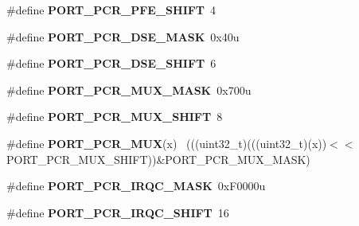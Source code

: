 \begin{DoxyCompactItemize}
\item 
\hypertarget{group___p_o_r_t___register___masks_gae7d057ebd3218784fca57f55a85f2d29}{}\#define {\bfseries P\+O\+R\+T\+\_\+\+P\+C\+R\+\_\+\+P\+F\+E\+\_\+\+S\+H\+I\+F\+T}~4\label{group___p_o_r_t___register___masks_gae7d057ebd3218784fca57f55a85f2d29}

\item 
\hypertarget{group___p_o_r_t___register___masks_gae1c37b9f66e58bd80e7764232fd05cee}{}\#define {\bfseries P\+O\+R\+T\+\_\+\+P\+C\+R\+\_\+\+D\+S\+E\+\_\+\+M\+A\+S\+K}~0x40u\label{group___p_o_r_t___register___masks_gae1c37b9f66e58bd80e7764232fd05cee}

\item 
\hypertarget{group___p_o_r_t___register___masks_ga00ae08038ade5432d0240666658d8867}{}\#define {\bfseries P\+O\+R\+T\+\_\+\+P\+C\+R\+\_\+\+D\+S\+E\+\_\+\+S\+H\+I\+F\+T}~6\label{group___p_o_r_t___register___masks_ga00ae08038ade5432d0240666658d8867}

\item 
\hypertarget{group___p_o_r_t___register___masks_ga0feec5fc6b285b83c573f913c74e5c41}{}\#define {\bfseries P\+O\+R\+T\+\_\+\+P\+C\+R\+\_\+\+M\+U\+X\+\_\+\+M\+A\+S\+K}~0x700u\label{group___p_o_r_t___register___masks_ga0feec5fc6b285b83c573f913c74e5c41}

\item 
\hypertarget{group___p_o_r_t___register___masks_gaa39e1cfed4df3797e4f1d141adab8776}{}\#define {\bfseries P\+O\+R\+T\+\_\+\+P\+C\+R\+\_\+\+M\+U\+X\+\_\+\+S\+H\+I\+F\+T}~8\label{group___p_o_r_t___register___masks_gaa39e1cfed4df3797e4f1d141adab8776}

\item 
\hypertarget{group___p_o_r_t___register___masks_gad20ae957ec775096862e8a6542463e03}{}\#define {\bfseries P\+O\+R\+T\+\_\+\+P\+C\+R\+\_\+\+M\+U\+X}(x)                                                ~(((uint32\+\_\+t)(((uint32\+\_\+t)(x))$<$$<$P\+O\+R\+T\+\_\+\+P\+C\+R\+\_\+\+M\+U\+X\+\_\+\+S\+H\+I\+F\+T))\&P\+O\+R\+T\+\_\+\+P\+C\+R\+\_\+\+M\+U\+X\+\_\+\+M\+A\+S\+K)\label{group___p_o_r_t___register___masks_gad20ae957ec775096862e8a6542463e03}

\item 
\hypertarget{group___p_o_r_t___register___masks_gabaef70d886fda0a7da8e862308bf5909}{}\#define {\bfseries P\+O\+R\+T\+\_\+\+P\+C\+R\+\_\+\+I\+R\+Q\+C\+\_\+\+M\+A\+S\+K}~0x\+F0000u\label{group___p_o_r_t___register___masks_gabaef70d886fda0a7da8e862308bf5909}

\item 
\hypertarget{group___p_o_r_t___register___masks_ga0bda43cd85ca4d5df17f12a193937d81}{}\#define {\bfseries P\+O\+R\+T\+\_\+\+P\+C\+R\+\_\+\+I\+R\+Q\+C\+\_\+\+S\+H\+I\+F\+T}~16\label{group___p_o_r_t___register___masks_ga0bda43cd85ca4d5df17f12a193937d81}


\end{DoxyCompactItemize}
